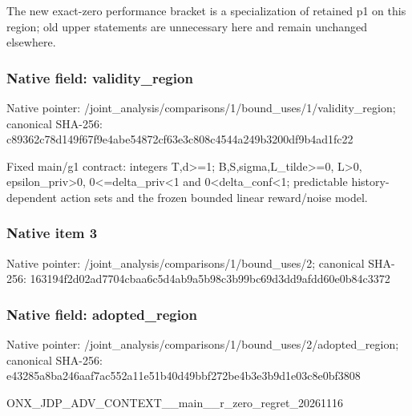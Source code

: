 \documentclass[10pt,a4paper]{article}
\begin{document}
\begingroup\raggedright\sloppy The new exact-zero performance bracket is a specialization of retained p1 on this region;\allowbreak{} old upper statements are unnecessary here and remain unchanged elsewhere.\par\endgroup

\subsubsection{Native field: validity\_\allowbreak{}region}
Native pointer: /joint\_\allowbreak{}analysis/comparisons/1/bound\_\allowbreak{}uses/1/validity\_\allowbreak{}region; canonical SHA-256: c89362c78d149f67f9e4abe54872cf63e3c808c4544a249b3200df9b4ad1fc22

\begingroup\raggedright\sloppy Fixed main/\allowbreak{}g1 contract:\allowbreak{} integers T,\allowbreak{}d>=\allowbreak{}1;\allowbreak{} B,\allowbreak{}S,\allowbreak{}sigma,\allowbreak{}L\_\allowbreak{}tilde>=\allowbreak{}0,\allowbreak{} L>0,\allowbreak{} epsilon\_\allowbreak{}priv>0,\allowbreak{} 0<=\allowbreak{}delta\_\allowbreak{}priv<1 and 0<delta\_\allowbreak{}conf<1;\allowbreak{} predictable history-dependent action sets and the frozen bounded linear reward/\allowbreak{}noise model.\par\endgroup

\subsubsection{Native item 3}
Native pointer: /joint\_\allowbreak{}analysis/comparisons/1/bound\_\allowbreak{}uses/2; canonical SHA-256: 163194f2d02ad7704cbaa6c5d4ab9a5b98c3b99bc69d3dd9afdd60e0b84c3372

\subsubsection{Native field: adopted\_\allowbreak{}region}
Native pointer: /joint\_\allowbreak{}analysis/comparisons/1/bound\_\allowbreak{}uses/2/adopted\_\allowbreak{}region; canonical SHA-256: e43285a8ba246aaf7ac552a11e51b40d49bbf272be4b3e3b9d1e03c8e0bf3808

\begingroup\raggedright\sloppy ONX\_\allowbreak{}JDP\_\allowbreak{}ADV\_\allowbreak{}CONTEXT\_\allowbreak{}\_\allowbreak{}main\_\allowbreak{}\_\allowbreak{}r\_\allowbreak{}zero\_\allowbreak{}regret\_\allowbreak{}20261116\par\endgroup
\end{document}
